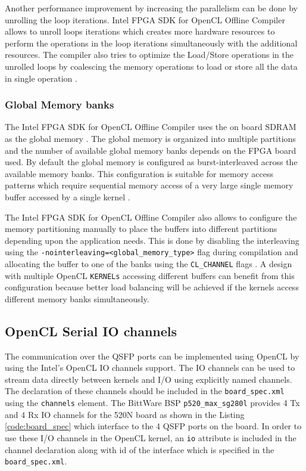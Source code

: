 Another performance improvement by increasing the parallelism can be done
by unrolling the loop iterations. Intel FPGA SDK for OpenCL Offline Compiler
allows to unroll loops iterations which creates more hardware resources to perform
the operations in the loop iterations simultaneously with the additional resources.
The compiler also tries to optimize the Load/Store operations in the
unrolled loops by coalescing the memory operations to load or store
all the data in single operation \cite{noauthor_intel_2019_best, section 3.2}.

\subsubsection{Global Memory banks}

The Intel FPGA SDK for OpenCL Offline Compiler uses the on board SDRAM as the global memory
\cite{noauthor_intel_2019_best, chapter 7}. The global memory is organized into multiple
partitions and the number of available global memory banks depends on the
FPGA board used. By default the global memory is configured as burst-interleaved
across the available memory banks. This configuration is suitable for memory
access patterns which require sequential memory access of a very large single memory
buffer accessed by a single kernel \cite{noauthor_intel_2019_best, section 7.2.1}.

The Intel FPGA SDK for OpenCL Offline Compiler also allows to configure the memory
partitioning manually to place the buffers into different partitions depending upon
the application needs. This is done by disabling the interleaving using the
\texttt{-nointerleaving=<global\_memory\_type>} flag during compilation and allocating the buffer to one of
the banks using the \texttt{CL\_CHANNEL} flags \cite{noauthor_intel_2019_prog, section 6.2.1}.
A design with multiple OpenCL \texttt{KERNELs} accessing different
buffers can benefit from this configuration because better load balancing will be achieved
if the kernels access different memory banks simultaneously.

\subsection{OpenCL Serial IO channels}

The communication over the QSFP ports can be implemented using OpenCL by using the
Intel's OpenCL IO channels support. The IO channels can be used to stream data
directly between kernels and I/O using explicitly named channels. The declaration
of these channels should be included in the \texttt{board\_spec.xml} using the
\texttt{channels} element. The BittWare BSP \texttt{p520\_max\_sg280l} provides
4 Tx and 4 Rx IO channels for the 520N board as shown in the Listing \ref{code:board_spec}
which interface to the 4 QSFP ports on the board.
In order to use these I/O channels in the OpenCL kernel,
an \texttt{io} attribute is included in the channel declaration along with id of
the interface which is specified in the \texttt{board\_spec.xml}.

